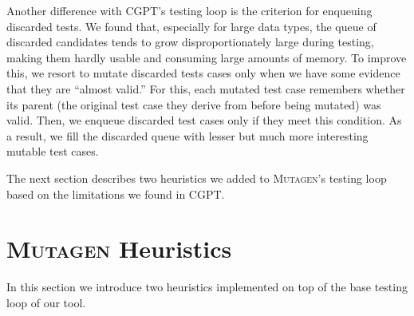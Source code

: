\documentclass[sigconf,review,anonymous]{acmart}
\newcommand{\mutagen}{\textsc{Mutagen}\xspace}
\begin{document}
\begin{algorithm}[t]
  \SetAlgoLined
  \DontPrintSemicolon
  \caption{\label{algo:mutagen:pick}\mutagen Seed Selection}
\end{algorithm}

Another difference with CGPT's testing loop is the criterion for enqueuing
discarded tests.
%
We found that, especially for large data types, the queue of discarded
candidates tends to grow disproportionately large during testing, making them
hardly usable and consuming large amounts of memory.
%
To improve this, we resort to mutate discarded tests cases only when we have
some evidence that they are ``almost valid.''
%
For this, each mutated test case remembers whether its parent (the original test
case they derive from before being mutated) was valid.
%
Then, we enqueue discarded test cases only if they meet this condition.
%
As a result, we fill the discarded queue with lesser but much more interesting
mutable test cases.


The next section describes two heuristics we added to \mutagen's testing loop
based on the limitations we found in CGPT.
%



\section{\mutagen Heuristics}
\label{sec:heuristics}


In this section we introduce two heuristics implemented on top of the base
testing loop of our tool.
\end{document}
